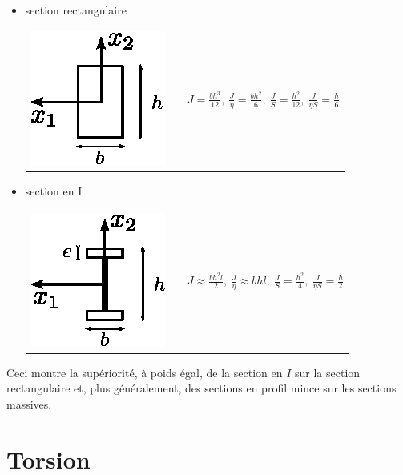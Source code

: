 \begin{itemize}
    \item section rectangulaire\\[5pt]
        \begin{tabular}{m{2cm}p{1cm}m{7cm}}
            \includegraphics{../images/T1_Ch07-07}&&
            $\displaystyle J = \frac{bh^3}{12},\ \frac{J}{\eta} = \frac{bh^2}{6},\ \frac{J}{S} = \frac{h^2}{12},\ \frac{J}{\eta S} = \frac{h}{6}$
        \end{tabular}
    \item section en I\\[5pt]
    \begin{tabular}{m{2cm}p{1cm}m{7cm}}
        \includegraphics{../images/T1_Ch07-08}&&
        $\displaystyle J \approx \frac{bh^2l}{2},\ \frac{J}{\eta} \approx bhl,\ \frac{J}{S} = \frac{h^2}{4},\ \frac{J}{\eta S} = \frac{h}{2}$
    \end{tabular}
\end{itemize}
Ceci montre la supériorité, à poids égal, de la section en $I$ sur la section rectangulaire et, plus généralement, des sections en profil mince sur les sections massives.

\section{Torsion} \label{sec:Ch07-2}
